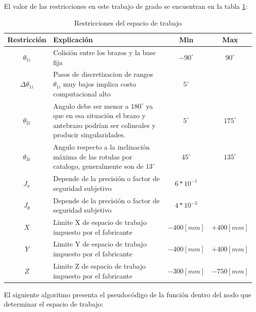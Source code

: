     El valor de las restricciones en este trabajo de grado se encuentran en la tabla \ref{t:cap6_ws_1}: 
    
            \begingroup
            \renewcommand{\arraystretch}{1.3}
            \begin{table}[H]
            \centering
            \begin{tabular}{c m{7.5cm} c c}
               \hline
               \textbf{Restricción}  & \textbf{Explicación} & \textbf{Min}& \textbf{Max}\\
               \hline           \hline            
             $\theta_{1i}$ & Colisión entre los brazos y la base fija & $-90^{\circ}$ & $90^{\circ}$\\
            \hline
             $\Delta\theta _{1i}$ & Pasos de discretizacion de rangos $\theta_{1i}$ muy bajos implica costo computacional alto& $5^{\circ}$ & $ $ \\
            \hline
             $\theta _{2i}$ & Angulo debe ser menor a $180^{\circ}$ ya que en esa situación el brazo y antebrazo podrían ser colineales y producir singularidades.& $5^{\circ}$ & $175^{\circ}$ \\
            \hline
             $\theta _{3i}$ & Angulo respecto a la inclinación máxima de las rotulas por catalogo, generalmente son de $13^{\circ}$ & $45^{\circ}$ & $135^{\circ}$ \\
            \hline
             $J_{x}$ & Depende de la precisión o factor de seguridad subjetivo& $6*10^{-1}$ & $ $ \\
            \hline
             $J_{\theta}$ & Depende de la precisión o factor de seguridad subjetivo& $4*10^{-3}$ & $ $ \\
            \hline
             $X$ & Limite X de espacio de trabajo impuesto por el fabricante & $-400[mm]$ & $+400[mm]$ \\
            \hline            
             $Y$ & Limite Y de espacio de trabajo impuesto por el fabricante & $-400[mm]$ & $+400[mm]$ \\
            \hline   
             $Z$ & Limite Z de espacio de trabajo impuesto por el fabricante & $-300[mm]$ & $-750[mm]$ \\
            \hline   
            \end{tabular}
            \caption{Restricciones del espacio de trabajo}
            \label{t:cap6_ws_1}
        \end{table}
        \endgroup     
        \newpage

    El siguiente algoritmo presenta el pseudocódigo de la función dentro del nodo que determinar el espacio de trabajo:
    

